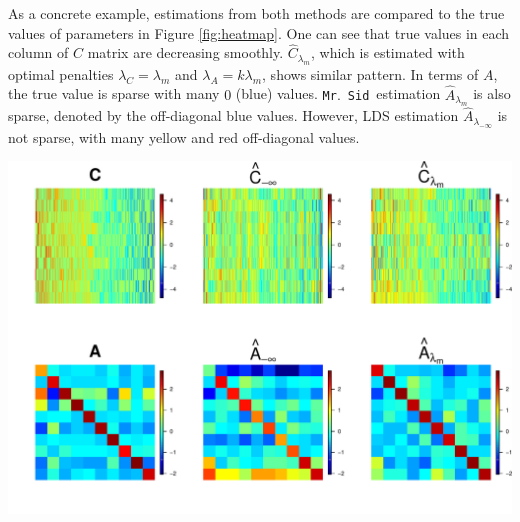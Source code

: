\documentclass[fleqn]{article}
\let\oldref\ref
\renewcommand{\ref}[1]{(\oldref{#1})}
\newcommand{\mrsid}{{\sc \texttt{Mr}.~\texttt{Sid}}}
\begin{document}
As a concrete example, estimations from both methods are compared to the true values of parameters in Figure \oldref{fig:heatmap}. One can see that true values in each column of $C$ matrix are decreasing smoothly. $\hat{C}_{\lambda_m}$, which is estimated with optimal penalties $\lambda_C = \lambda_m$ and $\lambda_A = k\lambda_m$, shows similar pattern. In terms of $A$, the true value is sparse with many $0$ (blue) values. \mrsid~estimation $\hat{A}_{\lambda_m}$ is also sparse, denoted by the off-diagonal blue values. However, LDS estimation $\hat{A}_{\lambda_{-\infty}}$ is not sparse, with many yellow and red off-diagonal values.
\begin{center}
 \includegraphics[scale=.6]{./figures/heatmap-figure-1}
 \label{fig:heatmap}
\end{center}



\end{document}
